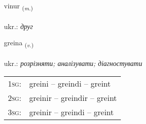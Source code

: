 \documentclass[frontgrid, backgrid]{flacards}\usepackage[]{graphicx}\usepackage[]{xcolor}
\begin{document}
\renewcommand{\flhead}{\vskip5pt \fboxsep=0pt {\small\bfseries\footnotesize Nafnorð | іменник}}
\renewcommand{\fcfoot}{\vskip5pt \fboxsep=0pt \hspace{2pt}{\small\bfseries\footnotesize 1K}}

\renewcommand{\blhead}{\vskip5pt {\small\bfseries\footnotesize Nafnorð | іменник }}
\renewcommand{\bcfoot}{\vskip5pt \hspace{2pt}{\small\bfseries\footnotesize 1K}}


{vinur \small{\textsubscript{(\textit{m.})}} \\[1ex] %
\textphonetic{[vɪːnʏr]} \\
ukr.: \emph{друг} \\  [2ex]
\renewcommand*{\arraystretch}{0.8}
}

\renewcommand{\flhead}{\vskip5pt \fboxsep=0pt {\small\bfseries\footnotesize Sagnorð | дієслово}}
\renewcommand{\fcfoot}{\vskip5pt \fboxsep=0pt \hspace{2pt}{\small\bfseries\footnotesize 1K}}

\renewcommand{\blhead}{\vskip5pt {\small\bfseries\footnotesize Sagnorð | дієслово }}
\renewcommand{\bcfoot}{\vskip5pt \hspace{2pt}{\small\bfseries\footnotesize 1K}}


{greina \small{\textsubscript{(\textit{v.})}} \\[1ex] %
\textphonetic{[kreiːna]} \\
ukr.: \emph{розрізняти; аналізувати; діагностувати} \\  [2ex]
\renewcommand*{\arraystretch}{0.8}
\begin{tabular}{p{1cm}l}
\textsc{1sg}: & greini -- greindi -- greint \\ 
\textsc{2sg}: & greinir -- greindir -- greint \\ 
\textsc{3sg}: & greinir -- greindi -- greint \\ 
\end{tabular}
}
\end{document}

